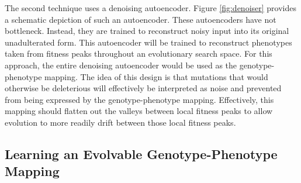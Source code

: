 

The second technique uses a denoising autoencoder.
Figure \ref{fig:denoiser} provides a schematic depiction of such an autoencoder.
These autoencoders have not bottleneck.
Instead, they are trained to reconstruct noisy input into its original unadulterated form.
This autoencoder will be trained to reconstruct phenotypes taken from fitness peaks throughout an evolutionary search space.
For this approach, the entire denoising autoencoder would be used as the genotype-phenotype mapping.
The idea of this design is that mutations that would otherwise be deleterious will effectively be interpreted as noise and prevented from being expressed by the genotype-phenotype mapping.
Effectively, this mapping should flatten out the valleys between local fitness peaks to allow evolution to more readily drift between those local fitness peaks.


\subsection{Learning an Evolvable Genotype-Phenotype Mapping}
